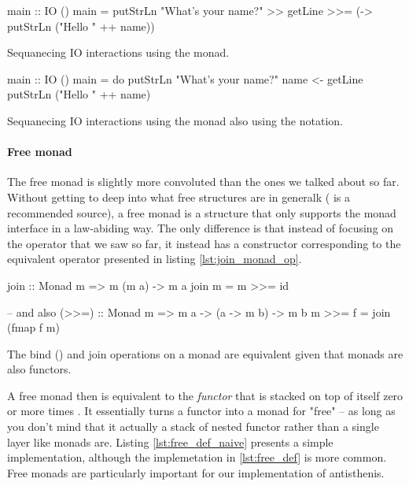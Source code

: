 \begin{code}
\begin{haskellcode}
main :: IO ()
main = putStrLn "What's your name?"
       >> getLine
       >>= (\name -> putStrLn ("Hello " ++ name))
\end{haskellcode}
  \caption{\label{lst:io_naive_example}Sequanecing IO interactions
    using the  monad.}
\end{code}

\begin{code}
\begin{haskellcode}
main :: IO ()
main = do
  putStrLn "What's your name?"
  name <- getLine
  putStrLn ("Hello " ++ name)
\end{haskellcode}
  \caption{\label{lst:io_sugar_example}Sequanecing IO interactions
    using the  monad also using the  notation.}
\end{code}

\paragraph{Free monad}

The free monad is slightly more convoluted than the ones we talked
about so far. Without getting to deep into what free structures are in
generalk (\cite{bartoszmilewskiDaoFunctionalProgramming} is a
recommended source), a free monad is a structure that only supports
the monad interface in a law-abiding way. The only difference is that
instead of focusing on the \hask{>>=} operator that we saw so far, it
instead has a constructor corresponding to the equivalent operator
 presented in listing \ref{lst:join_monad_op}.

\begin{code}
\begin{haskellcode}
join :: Monad m => m (m a) -> m a
join m = m >>= id

-- and also
(>>=) :: Monad m => m a -> (a -> m b) -> m b
m >>= f = join (fmap f m)
\end{haskellcode}
\label{lst:join_monad_op}
\caption{The bind (\hask{>>=}) and join operations on a monad are
  equivalent given that monads are also functors.}
\end{code}

A free monad  then is equivalent to the \emph{functor}
 that is stacked on top of itself zero or more times . It essentially turns a functor into a monad for
"free" -- as long as you don't mind that it actually a stack of nested
functor rather than a single layer like monads are. Listing
\ref{lst:free_def_naive} presents a simple implementation, although
the implemetation in \ref{lst:free_def} is more common. Free monads
are particularly important for our implementation of antisthenis.

